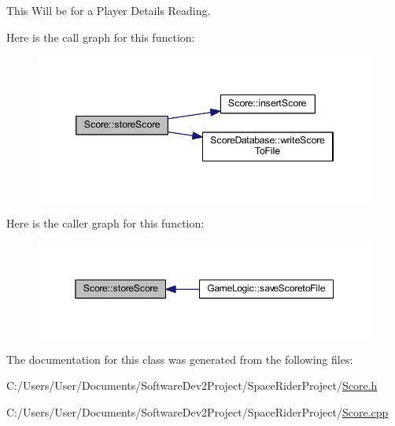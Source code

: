 This Will be for a Player Details Reading. 

Here is the call graph for this function\+:
\nopagebreak
\begin{figure}[H]
\begin{center}
\leavevmode
\includegraphics[width=346pt]{class_score_a8cc9e62ee4d086c0f2e1b8ef6d2cbf8d_cgraph}
\end{center}
\end{figure}
Here is the caller graph for this function\+:
\nopagebreak
\begin{figure}[H]
\begin{center}
\leavevmode
\includegraphics[width=350pt]{class_score_a8cc9e62ee4d086c0f2e1b8ef6d2cbf8d_icgraph}
\end{center}
\end{figure}


The documentation for this class was generated from the following files\+:\begin{DoxyCompactItemize}
\item 
C\+:/\+Users/\+User/\+Documents/\+Software\+Dev2\+Project/\+Space\+Rider\+Project/\hyperlink{_score_8h}{Score.\+h}\item 
C\+:/\+Users/\+User/\+Documents/\+Software\+Dev2\+Project/\+Space\+Rider\+Project/\hyperlink{_score_8cpp}{Score.\+cpp}\end{DoxyCompactItemize}

